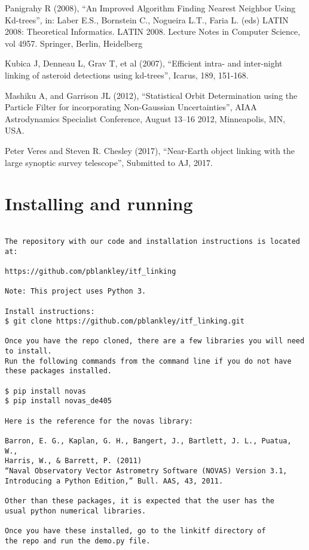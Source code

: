 \documentclass[11pt,letter]{article}
\begin{document}
\noindent
Panigrahy R (2008), ``An Improved Algorithm Finding Nearest Neighbor Using Kd-trees'', in: Laber E.S., Bornstein C., Nogueira L.T., Faria L. (eds) LATIN 2008: Theoretical Informatics. LATIN 2008. Lecture Notes in Computer Science, vol 4957. Springer, Berlin, Heidelberg\neline\newline

\noindent
Kubica J, Denneau L, Grav T, et al (2007), ``Efficient intra- and inter-night linking of asteroid detections using kd-trees'', Icarus, 189, 151-168.\newline

\noindent
Mashiku A, and Garrison JL (2012), ``Statistical Orbit Determination using the Particle
Filter for incorporating Non-Gaussian Uncertainties'', AIAA Astrodynamics Specialist Conference, August 13–16 2012, Minneapolis, MN, USA.\newline

\noindent
Peter Veres and Steven R. Chesley (2017), ``Near-Earth object linking with the large synoptic survey telescope'', Submitted to AJ, 2017.\newline

\newpage
\section*{Installing and running}

\begin{verbatim}

The repository with our code and installation instructions is located at:

https://github.com/pblankley/itf_linking

Note: This project uses Python 3. 

Install instructions:
$ git clone https://github.com/pblankley/itf_linking.git

Once you have the repo cloned, there are a few libraries you will need to install.
Run the following commands from the command line if you do not have these packages installed.

$ pip install novas
$ pip install novas_de405

Here is the reference for the novas library:

Barron, E. G., Kaplan, G. H., Bangert, J., Bartlett, J. L., Puatua, W., 
Harris, W., & Barrett, P. (2011) 
“Naval Observatory Vector Astrometry Software (NOVAS) Version 3.1, 
Introducing a Python Edition,” Bull. AAS, 43, 2011.

Other than these packages, it is expected that the user has the 
usual python numerical libraries.

Once you have these installed, go to the linkitf directory of 
the repo and run the demo.py file.

\end{verbatim}
\end{document}
